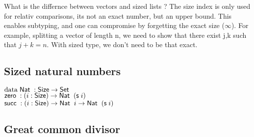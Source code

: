 What is the differnce between vectors and sized lists ?
The size index is only used for relativ comparisons, its not an exact number, but an upper bound.
This enables subtyping, and one can compromise by forgetting the exact size ($\infty$).
For example, splitting a vector of length n, we need to show that there exist j,k such that $j+k = n$.
With sized type, we don't need to be that exact.
\subsection{Sized natural numbers}
\begin{bsp}
$\mathrm{data}\; \mathsf{Nat}\; : \mathsf{Size} \rightarrow \mathsf{Set} $ \\
$\mathsf{zero}\; : ( i : \mathsf{Size} ) \rightarrow{ \mathsf{Nat}\;\; (\mathsf{s}\;i)} $\\
$\mathsf{succ}\; : ( i : \mathsf{Size} ) \rightarrow{ \mathsf{Nat}\;\; i \rightarrow\mathsf{Nat}\;\; (\mathsf{s}\;i)} $
\end{bsp}

\subsection{Great common divisor}

